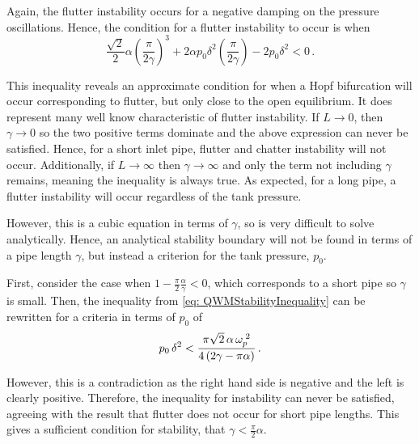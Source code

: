 Again, the flutter instability occurs for a negative damping on the pressure oscillations. Hence, the condition for a flutter instability to occur is when
~
\begin{equation} \label{eq: QWMStabilityInequality}
    \frac{\sqrt{2}}{2} \alpha \left( \frac{\pi}{2 \gamma} \right)^3 + 2 \alpha p_0 \delta^2 \left( \frac{\pi}{2 \gamma} \right) - 2 p_0 \delta^2 < 0 \, .
\end{equation}

This inequality reveals an approximate condition for when a Hopf bifurcation will occur corresponding to flutter, but only close to the open equilibrium. It does represent many well know characteristic of flutter instability. If $L \rightarrow 0$, then $\gamma \rightarrow 0$ so the two positive terms dominate and the above expression can never be satisfied. Hence, for a short inlet pipe, flutter and chatter instability will not occur. Additionally, if $L \rightarrow \infty$ then $\gamma \rightarrow \infty$ and only the term not including $\gamma$ remains, meaning the inequality is always true. As expected, for a long pipe, a flutter instability will occur regardless of the tank pressure.

However, this is a cubic equation in terms of $\gamma$, so is very difficult to solve analytically. Hence, an analytical stability boundary will not be found in terms of a pipe length $\gamma$, but instead a criterion for the tank pressure, $p_0$.

First, consider the case when $1 - \frac{\pi}{2} \frac{\alpha}{\gamma} < 0$, which corresponds to a short pipe so $\gamma$ is small. Then, the inequality from \cref{eq: QWMStabilityInequality} can be rewritten for a criteria in terms of $p_0$ of
~
\begin{equation*}
    p_0 \, \delta^2 < \frac{\pi \sqrt{2} \, \alpha \, \omega_p^{\;2}}{4 \left( 2 \gamma - \pi \alpha \right)} \, .
\end{equation*}

However, this is a contradiction as the right hand side is negative and the left is clearly positive. Therefore, the inequality for instability can never be satisfied, agreeing with the result that flutter does not occur for short pipe lengths. This gives a sufficient condition for stability, that $\gamma < \frac{\pi}{2} \alpha$.

